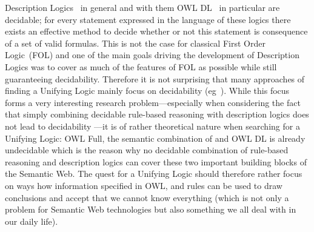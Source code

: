 Description Logics~\cite{dl} in general and with them OWL DL~\cite{owldsem} in particular are decidable; for every statement expressed in the language of these logics there
exists an effective method to decide whether or not this statement is consequence of a set of valid formulas. This is not the case for classical 
First Order Logic~(FOL) and one of the main goals driving the development of Description Logics was to cover as much of the features of FOL as possible while still guaranteeing 
decidability. Therefore it is not surprising that many approaches of finding a Unifying Logic mainly focus on decidability (eg~\cite{unilogic,dllog}). 
While this focus forms a very interesting research problem---especially when considering the fact that simply combining decidable rule-based reasoning with description logics 
does not lead to decidability \cite{orl}---it is of rather theoretical nature when searching for a Unifying Logic: OWL Full, 
the semantic combination of \rdf and OWL DL is already undecidable which is the reason why no decidable combination of rule-based reasoning and description logics can cover these 
two important building blocks of the Semantic Web.
The quest for a Unifying Logic should therefore rather focus on ways how information specified in OWL, \rdf and rules can be used to draw conclusions
and accept that we cannot know everything (which is not only a problem  for Semantic Web technologies but also something we all deal with in our daily life).






